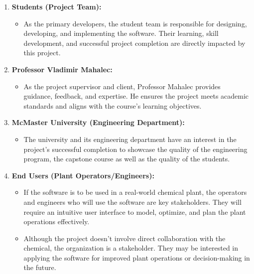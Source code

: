 \documentclass{article}
\begin{document}
\begin{enumerate}
    \item \textbf{Students (Project Team):}
    \begin{itemize}
        \item As the primary developers, the student team is responsible for designing, developing, and implementing the software. Their learning, skill development, and successful project completion are directly impacted by this project.
    \end{itemize}

    \item \textbf{Professor Vladimir Mahalec:}
    \begin{itemize}
        \item As the project supervisor and client, Professor Mahalec provides guidance, feedback, and expertise. He ensures the project meets academic standards and aligns with the course's learning objectives. 
    \end{itemize}

    \item \textbf{McMaster University (Engineering Department):}
    \begin{itemize}
        \item The university and its engineering department have an interest in the project's successful completion to showcase the quality of the engineering program, the capstone course as well as the quality of the students.
    \end{itemize}

    \item \textbf{End Users (Plant Operators/Engineers):}
    \begin{itemize}
        \item If the software is to be used in a real-world chemical plant, the operators and engineers who will use the software are key stakeholders. They will require an intuitive user interface to model, optimize, and plan the plant operations effectively.
    \end{itemize}

    \begin{itemize}
        \item Although the project doesn't involve direct collaboration with the chemical, the organization is a stakeholder. They may be interested in applying the software for improved plant operations or decision-making in the future.
    \end{itemize}


\end{enumerate}
\end{document}
